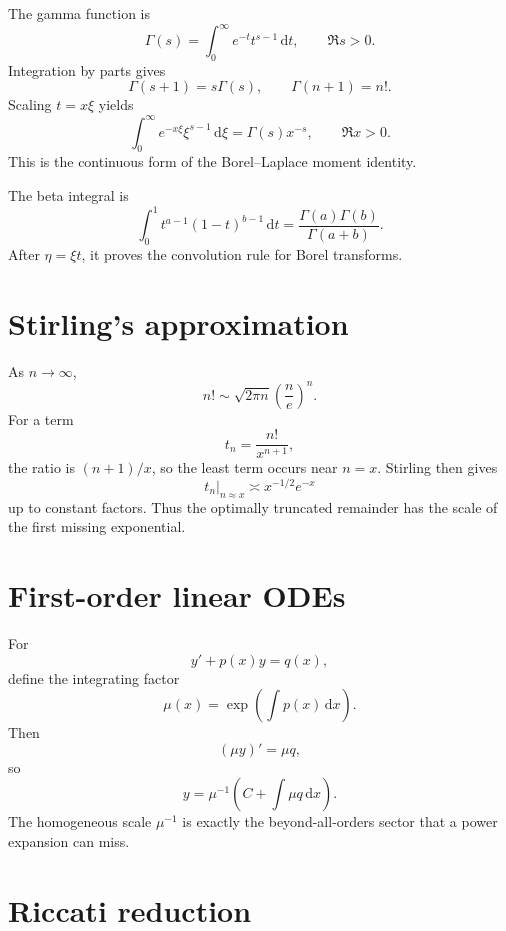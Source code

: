\documentclass[11pt,openany]{book}
\theoremstyle{definition}
\theoremstyle{plain}
\theoremstyle{remark}
\newcommand{\dd}{\,\mathrm{d}}
\begin{document}
The gamma function is
\begin{equation}\label{eq:gamma-integral-app}
 \Gamma(s)=\int_0^\infty e^{-t}t^{s-1}\dd t,
 \qquad \Re s>0.
\end{equation}
Integration by parts gives
\[
 \Gamma(s+1)=s\Gamma(s),
 \qquad
 \Gamma(n+1)=n!.
\]
Scaling $t=x\xi$ yields
\[
 \int_0^\infty e^{-x\xi}\xi^{s-1}\dd\xi
 =\Gamma(s)x^{-s},
 \qquad\Re x>0.
\]
This is the continuous form of the Borel--Laplace moment identity.

The beta integral is
\begin{equation}\label{eq:beta-integral-app}
 \int_0^1t^{a-1}(1-t)^{b-1}\dd t
 =\frac{\Gamma(a)\Gamma(b)}{\Gamma(a+b)}.
\end{equation}
After $\eta=\xi t$, it proves the convolution rule for Borel transforms.

\section{Stirling's approximation}

As $n\to\infty$,
\begin{equation}\label{eq:stirling-app}
 n!\sim\sqrt{2\pi n}\left(\frac ne\right)^n.
\end{equation}
For a term
\[
 t_n=\frac{n!}{x^{n+1}},
\]
the ratio is $(n+1)/x$, so the least term occurs near $n=x$. Stirling then gives
\[
 t_n\big|_{n\approx x}
 \asymp x^{-1/2}e^{-x}
\]
up to constant factors. Thus the optimally truncated remainder has the scale of the first missing exponential.

\section{First-order linear ODEs}

For
\begin{equation}\label{eq:first-order-app}
 y'+p(x)y=q(x),
\end{equation}
define the integrating factor
\[
 \mu(x)=\exp\left(\int p(x)\dd x\right).
\]
Then
\[
 (\mu y)'=\mu q,
\]
so
\begin{equation}\label{eq:first-order-app-solution}
 y=\mu^{-1}\left(C+\int\mu q\dd x\right).
\end{equation}
The homogeneous scale $\mu^{-1}$ is exactly the beyond-all-orders sector that a power expansion can miss.

\section{Riccati reduction}
\end{document}
